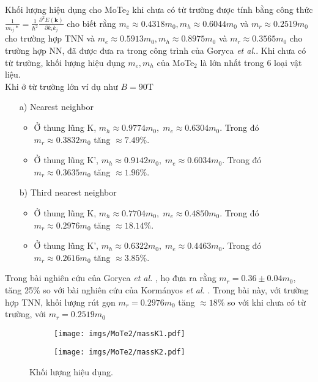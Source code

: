 \documentclass{article}
\begin{document}
Khối lượng hiệu dụng cho MoTe$_{2}$ khi chưa có từ trường được tính bằng công thức $\frac{1}{m_{ij}*} =\frac{1}{\hbar^{2}} \frac{\partial^{2} E(\mathbf{k})}{\partial k_{i} k_{j}}$ cho biết rằng $m_{e} \approx 0.4318 m_{0}, m_{h} \approx 0.6044 m_{0}$ và $m_{r} \approx 0.2519 m_{0}$ cho trường hợp TNN và $m_{e} \approx 0.5913 m_{0}, m_{h} \approx 0.8975 m_{0}$ và $m_{r} \approx 0.3565 m_{0}$ cho trường hợp NN, đã được đưa ra trong công trình của Goryca \textit{et al.}\cite{goryca2019}. Khi chưa có từ trường, khối lượng hiệu dụng $m_{e}, m_{h}$ của MoTe$_{2}$ là lớn nhất trong 6 loại vật liệu. \\
Khi ở từ trường lớn ví dụ như $B = 90 $T
\begin{itemize}
	\item[a)] Nearest neighbor
	\begin{itemize}
		\item Ở thung lũng K, $m_{h} \approx 0.9774 m_{0},\; m_{e} \approx 0.6304 m_{0}$. 
		Trong đó $m_{r} \approx 0.3832 m_{0}$ tăng $\approx 7.49\%$.
		
		\item Ở thung lũng K', $m_{h} \approx 0.9142 m_{0},\; m_{e} \approx 0.6034 m_{0}$. 
		Trong đó $m_{r} \approx 0.3635 m_{0}$ tăng $\approx 1.96\%$.
	\end{itemize}
	\item[b)] Third nearest neighbor
	\begin{itemize}
		\item Ở thung lũng K, $m_{h} \approx 0.7704 m_{0},\; m_{e} \approx 0.4850 m_{0}$. 
		Trong đó $m_{r} \approx 0.2976 m_{0}$ tăng $\approx 18.14\%$.
		
		\item Ở thung lũng K', $m_{h} \approx 0.6322 m_{0},\; m_{e} \approx 0.4463 m_{0}$. 
		Trong đó $m_{r} \approx 0.2616 m_{0}$ tăng $\approx 3.85\%$.
	\end{itemize}
\end{itemize}
Trong bài nghiên cứu của Goryca \textit{et al.} \cite{goryca2019}, họ đưa ra rằng $m_{r} = 0.36 \pm 0.04 m_{0}$, tăng 25\% so với bài nghiên cứu của Korm\'{a}nyos \textit{et al.} \cite{kormanyos2015}. Trong bài này, với trường hợp TNN, khối lượng rút gọn $m_{r} = 0.2976 m_{0}$ tăng $\approx 18\%$ so với khi chưa có từ trường, với $m_{r} = 0.2519 m_{0}$
\begin{figure}[htb]
	\begin{subfigure}{0.495\textwidth}
		\centering
		\texttt{[image: imgs/MoTe2/massK1.pdf]}
	\end{subfigure}
	\begin{subfigure}{0.495\textwidth}
		\centering
		\texttt{[image: imgs/MoTe2/massK2.pdf]}
	\end{subfigure}
	\caption{Khối lượng hiệu dụng.}
\end{figure}
\end{document}
